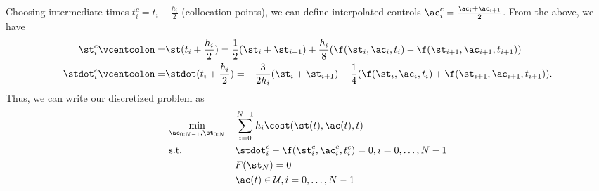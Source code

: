 Choosing intermediate times $t_i^c = t_i + \frac{h_i}{2}$ (collocation points), we can define interpolated controls $\ac^c_i = \frac{\ac_i + \ac_{i+1}}{2}$. From the above, we have
\begin{align}
    \st^c_i \vcentcolon=& \st(t_i + \frac{h_i}{2}) = \frac{1}{2} (\st_i + \st_{i+1}) + \frac{h_i}{8} (\f(\st_i,\ac_i,t_i) - \f(\st_{i+1},\ac_{i+1},t_{i+1}))\\
    \stdot^c_i \vcentcolon=& \stdot(t_i + \frac{h_i}{2}) = -\frac{3}{2h_i} (\st_i + \st_{i+1}) - \frac{1}{4} (\f(\st_i,\ac_i,t_i) + \f(\st_{i+1},\ac_{i+1},t_{i+1})).
\end{align}
Thus, we can write our discretized problem as 
\begin{equation}
\begin{aligned}
\label{eq:ocp}
& \underset{\ac_{0:N-1},\st_{0:N}}{\min} & & \sum_{i=0}^{N-1} h_i \cost(\st(t),\ac(t),t)\\
& \textrm{s.t.} & & \stdot_i^c - \f(\st^c_i, \ac^c_i,t_i^c) = 0, i = 0, \ldots, N-1\\
& & & F(\st_N) = 0\\
& & & \ac(t) \in \mathcal{U}, i = 0, \ldots, N-1
\end{aligned}
\end{equation}





